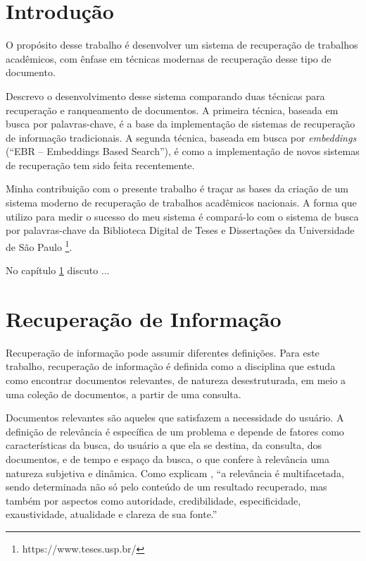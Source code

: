 \documentclass[
	12pt,				%
	openright,			%
	oneside,			%
	a4paper,			%
	english,			%
	french,				%
	spanish,			%
	brazil				%
	]{abntex2}
\begin{document}
\textual

\chapter*[Introdução]{Introdução}
\label{chap:intro}


O propósito desse trabalho é desenvolver um sistema de recuperação de trabalhos acadêmicos, com ênfase em técnicas modernas
de recuperação desse tipo de documento.

Descrevo o desenvolvimento desse sistema comparando duas técnicas para recuperação e ranqueamento de documentos.
A primeira técnica, baseada em busca por palavras-chave, é a base da implementação de sistemas de recuperação de informação tradicionais.
A segunda técnica, baseada em busca por \textit{embeddings} (``EBR -- Embeddings Based Search''), é como a implementação de novos sistemas de recuperação
tem sido feita recentemente.

Minha contribuição com o presente trabalho é traçar as bases da criação de um sistema moderno de recuperação de trabalhos acadêmicos nacionais.
A forma que utilizo para medir o sucesso do meu sistema é compará-lo com o sistema de busca por palavras-chave da Biblioteca Digital
de Teses e Dissertações da Universidade de São Paulo \footnote{https://www.teses.usp.br/}.

No capítulo \ref{ch:recuperacao-de-informacao} discuto ...


\chapter{Recuperação de Informação}\label{ch:recuperacao-de-informacao}

Recuperação de informação pode assumir diferentes definições.
Para este trabalho, recuperação de informação é definida como a disciplina que estuda como encontrar documentos relevantes, de natureza desestruturada, em meio a uma coleção de documentos, a
partir de uma consulta. \cite{manning2008introduction}

Documentos relevantes são aqueles que satisfazem a necessidade do usuário. \cite{manning2008introduction}
A definição de relevância é específica de um problema e depende de fatores como
características da busca, do usuário a que ela se destina, da consulta, dos documentos, e de
tempo e espaço da busca, o que confere à relevância uma natureza subjetiva e dinâmica.
Como explicam \citeauthor{Ceri2013}, ``a relevância é multifacetada, sendo determinada não só pelo conteúdo de um
resultado recuperado, mas também por aspectos como autoridade, credibilidade, especificidade, exaustividade,
atualidade e clareza de sua fonte.''
\end{document}
